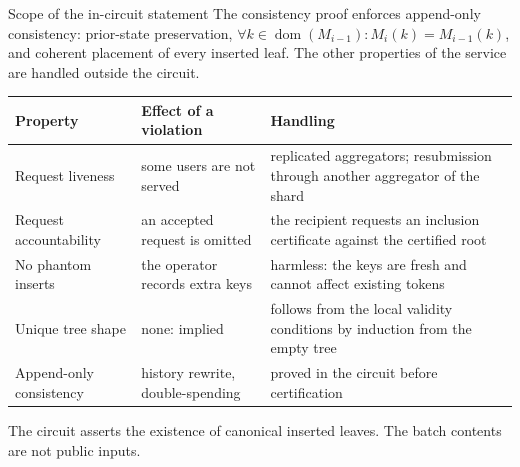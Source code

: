 \documentclass[aspectratio=169,10pt]{beamer}
\newcommand{\dom}{\operatorname{dom}}
\begin{document}
\begin{frame}{Scope of the in-circuit statement}
\small
The consistency proof enforces append-only consistency: prior-state preservation, $\forall k \in \dom(M_{i-1})\colon M_i(k) = M_{i-1}(k)$, and coherent placement of every inserted leaf. The other properties of the service are handled outside the circuit.

\vspace{2mm}
\footnotesize
\begin{tabular}{@{}>{\raggedright}p{3.0cm} >{\raggedright}p{4.4cm} >{\raggedright\arraybackslash}p{5.6cm}@{}}
\toprule
Property & Effect of a violation & Handling \\
\midrule
Request liveness & some users are not served & replicated aggregators; resubmission through another aggregator of the shard \\
Request accountability & an accepted request is omitted & the recipient requests an inclusion certificate against the certified root \\
No phantom inserts & the operator records extra keys & harmless: the keys are fresh and cannot affect existing tokens \\
Unique tree shape & none: implied & follows from the local validity conditions by induction from the empty tree \\
\textcolor{uOrange}{Append-only consistency} & history rewrite, double-spending & \textcolor{uOrange}{proved in the circuit before certification} \\
\bottomrule
\end{tabular}

\vspace{2mm}
\small The circuit asserts the existence of canonical inserted leaves. The batch contents are not public inputs.
\end{frame}
\end{document}
